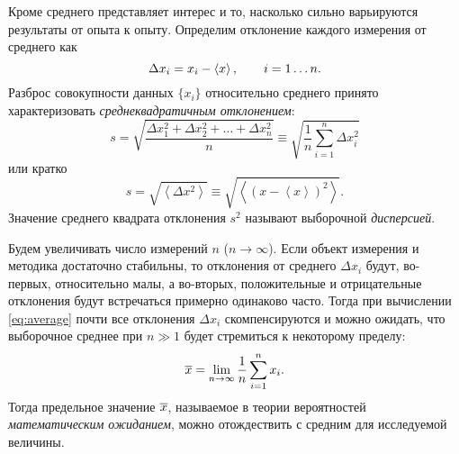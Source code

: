 

Кроме среднего представляет интерес и то, насколько сильно варьируются
результаты от опыта к опыту. Определим отклонение каждого измерения от среднего как
\[
\Delta x_{i}=x_{i}-\left<x\right>,\qquad i=1\ldots n.
\]
Разброс совокупности данных $\{x_i\}$ относительно среднего принято характеризовать
\emph{среднеквадратичным отклонением}:
\begin{equation}
s = \sqrt{\frac{\Delta x_{1}^{2}+\Delta x_{2}^{2}+\ldots+\Delta
x_{n}^{2}}{n}}\equiv \sqrt{\frac{1}{n}\sum\limits _{i=1}^{n}\Delta
x_{i}^{2}}\label{eq:sigma}
\end{equation}
или кратко
\begin{equation}
s = \sqrt{\left<\Delta x^{2}\right>} \equiv \sqrt{\left<(x-\left<x\right>)^{2}\right>}.\label{eq:sigma_s}
\end{equation}
Значение среднего квадрата отклонения $s^{2}$ называют выборочной \emph{дисперсией}.

%

Будем увеличивать число измерений $n$ ($n\to \infty$). Если объект измерения и методика
достаточно стабильны, то отклонения от среднего $\Delta x_i$ будут, во-первых,
относительно малы, а во-вторых, положительные и отрицательные отклонения будут
встречаться примерно одинаково часто. Тогда при вычислении \eqref{eq:average}
почти все отклонения $\Delta x_i$ скомпенсируются и можно ожидать,
что выборочное среднее при $n\gg 1$ будет стремиться к некоторому пределу:
\[
\overline{x} = \lim_{n\to\infty}\frac{1}{n}\sum_{i=1}^{n}x_{i}.
\]
Тогда предельное значение $\overline{x}$, называемое в теории вероятностей \emph{математическим ожиданием}, 
можно отождествить с  средним для исследуемой величины.

